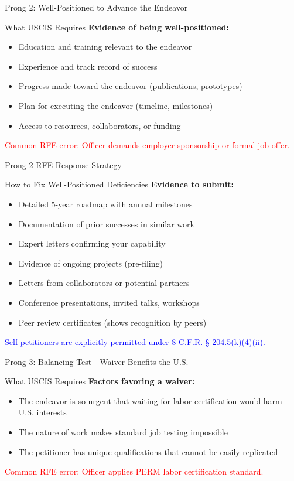 \documentclass[11pt]{beamer}
\begin{document}
	\begin{frame}{Prong 2: Well-Positioned to Advance the Endeavor}
		\scriptsize
		\begin{block}{What USCIS Requires}
			\textbf{Evidence of being well-positioned:}
			\begin{itemize}
				\item Education and training relevant to the endeavor
				\item Experience and track record of success
				\item Progress made toward the endeavor (publications, prototypes)
				\item Plan for executing the endeavor (timeline, milestones)
				\item Access to resources, collaborators, or funding
			\end{itemize}
			\textcolor{red}{Common RFE error: Officer demands employer sponsorship or formal job offer.}
		\end{block}
	\end{frame}
	
	\begin{frame}{Prong 2 RFE Response Strategy}
		\scriptsize
		\begin{block}{How to Fix Well-Positioned Deficiencies}
			\textbf{Evidence to submit:}
			\begin{itemize}
				\item Detailed 5-year roadmap with annual milestones
				\item Documentation of prior successes in similar work
				\item Expert letters confirming your capability
				\item Evidence of ongoing projects (pre-filing)
				\item Letters from collaborators or potential partners
				\item Conference presentations, invited talks, workshops
				\item Peer review certificates (shows recognition by peers)
			\end{itemize}
			\textcolor{blue}{Self-petitioners are explicitly permitted under 8 C.F.R. § 204.5(k)(4)(ii).}
		\end{block}
	\end{frame}
	
	\begin{frame}{Prong 3: Balancing Test - Waiver Benefits the U.S.}
		\scriptsize
		\begin{block}{What USCIS Requires}
			\textbf{Factors favoring a waiver:}
			\begin{itemize}
				\item The endeavor is so urgent that waiting for labor certification would harm U.S. interests
				\item The nature of work makes standard job testing impossible
				\item The petitioner has unique qualifications that cannot be easily replicated
			\end{itemize}
			\textcolor{red}{Common RFE error: Officer applies PERM labor certification standard.}
		\end{block}
	\end{frame}
	
\end{document}
